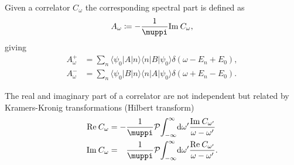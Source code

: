 Given a correlator $C_\omega$ the corresponding spectral part is defined as
\begin{equation}
    A_\omega \coloneq -\frac{1}{\muppi}\Im C_\omega,
\end{equation}
giving
\begin{subequations}
    \begin{align}
        A^+_\omega
         & =
        \sum_n \langle\psi_0 | A | n\rangle\langle n | B | \psi_0\rangle \delta(\omega - E_n + E_0),
        \label{eq:spectral-part-plus} \\
        A^-_\omega
         & =
        \sum_n \langle\psi_0 | B | n\rangle\langle n | A | \psi_0\rangle \delta(\omega + E_n - E_0).
        \label{eq:spectral-part-minus}
    \end{align}
\end{subequations}

The real and imaginary part of a correlator are not independent
but related by Kramers-Kronig transformations (Hilbert transform)
\begin{subequations}
    \begin{align}
        \Re C_\omega
         & =
        - \frac{1}{\muppi} \mathcal{P}\! \int_{-\infty}^\infty\! \md\omega'
        \frac{\Im C_{\omega'}}{\omega - \omega'}
        \label{eq:kramers-kroneg-real} \\
        \Im C_\omega
         & =
        \phantom{-} \frac{1}{\muppi} \mathcal{P}\! \int_{-\infty}^\infty\! \md\omega'
        \frac{\Re C_{\omega'}}{\omega - \omega'}.
        \label{eq:kramers-kronig-imag}
    \end{align}
\end{subequations}

